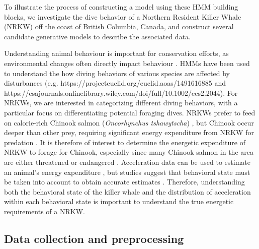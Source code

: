 

To illustrate the process of constructing a model using these HMM building blocks, we investigate the dive behavior of a Northern Resident Killer Whale (NRKW) off the coast of British Columbia, Canada, and construct several candidate generative models to describe the associated data.

Understanding animal behaviour is important for conservation efforts, as environmental changes often directly impact behaviour \citep{Sutherland:1998}. HMMs have been used to understand the how diving behaviors of various species are affected by disturbances (e.g. https://projecteuclid.org/euclid.aoas/1491616885  and https://esajournals.onlinelibrary.wiley.com/doi/full/10.1002/ecs2.2044). For NRKWs, we are interested in categorizing different diving behaviors, with a particular focus on differentiating potential foraging dives. NRKWs prefer to feed on calorie-rich Chinook salmon (\textit{Oncorhynchus
tshawytscha}) \citep{Ford:2006}, but Chinook occur deeper than other prey, requiring significant energy expenditure from NRKW for predation \citep{Williams:2009,Noren:2011}. It is therefore of interest to determine the energetic expenditure of NRKW to forage for Chinook, especially since many Chinook salmon in the area are either threatened or endangered \citep{Ford:2015}. Acceleration data can be used to estimate an animal's energy expenditure \citep{Green:2009,Wilson:2019}, but studies suggest that behavioral state must be taken into account to obtain accurate estimates \citep{Dot:2016}. Therefore, understanding both the behavioral state of the killer whale and the distribution of acceleration within each behavioral state is important to understand the true energetic requirements of a NRKW.

\subsection{Data collection and preprocessing}

